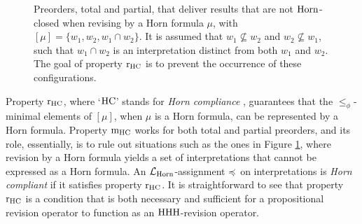 \begin{figure}\centering
	\caption{
		Preorders, total and partial, that deliver results that 
		are not $\mathrm{Horn}$-closed when revising by a Horn formula $\mu$, 
		with $[\mu]=\{w_1,w_2,w_1\cap w_2\}$.
		It is assumed that $w_1\nsubseteq w_2$ and $w_2\nsubseteq w_1$,
		such that $w_1\cap w_2$ is an interpretation distinct from both $w_1$ and $w_2$.
		The goal of property $\mathrm{r}_{\mathrm{HC}}$ is to prevent the occurrence of these configurations.
	}
	\label{fig:6-hhh-revision-non-compliant-preorders}
\end{figure}

Property $\mathrm{r}_{\mathrm{HC}}$, where `$\mathrm{HC}$' 
stands for \emph{Horn compliance} \cite{DelgrandeP15,DelgrandePW18},
guarantees that the $\le_{\phi}$-minimal elements of $[\mu]$,
when $\mu$ is a Horn formula, can be represented by a Horn formula.
Property $\mathrm{m}_{\mathrm{HC}}$ works for both total and partial preorders,
and its role, essentially, is to rule out situations such as the ones 
in Figure \ref{fig:6-hhh-revision-non-compliant-preorders},
where revision by a Horn formula yields a set of interpretations 
that cannot be expressed as a Horn formula.
An $\mathcal{L}_{\mathrm{Horn}}$-assignment $\preccurlyeq$ on interpretations 
is \emph{Horn compliant} if it satisfies property $\mathrm{r}_{\mathrm{HC}}$.
It is straightforward to see that
property $\mathrm{r}_{\mathrm{HC}}$ is a condition that is both necessary and sufficient
for a propositional revision operator to function as an ${\mathrm{HHH}}$-revision operator.



